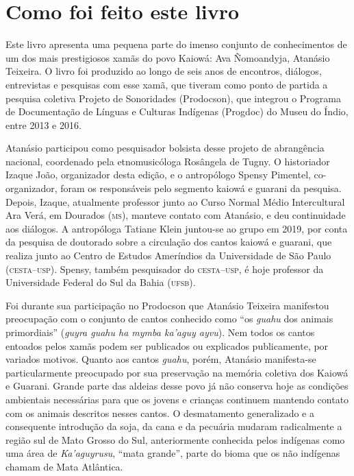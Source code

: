 \chapter{Como foi feito este livro}

Este livro apresenta uma pequena parte do imenso conjunto de
conhecimentos de um dos mais prestigiosos xamãs do povo Kaiowá: Ava
Ñomoandyja, Atanásio Teixeira. O livro foi produzido ao longo de seis
anos de encontros, diálogos, entrevistas e pesquisas com esse xamã, que
tiveram como ponto de partida a pesquisa coletiva Projeto de Sonoridades
(Prodocson), que integrou o Programa de Documentação de Línguas e
Culturas Indígenas (Progdoc) do Museu do Índio, entre 2013 e 2016.

Atanásio participou como pesquisador bolsista desse projeto de
abrangência nacional, coordenado pela etnomusicóloga Rosângela de Tugny.
O historiador Izaque João, organizador desta edição, e o antropólogo
Spensy Pimentel, co-organizador, foram os responsáveis pelo segmento
kaiowá e guarani da pesquisa. Depois, Izaque, atualmente
professor junto ao Curso Normal Médio Intercultural Ara Verá, em
Dourados (\textsc{ms}), manteve contato com Atanásio, e deu continuidade aos
diálogos. A antropóloga Tatiane Klein juntou-se ao grupo em 2019, por
conta da pesquisa de doutorado sobre a circulação dos cantos kaiowá e
guarani, que realiza junto ao Centro de Estudos Ameríndios da
Universidade de São Paulo (\textsc{cesta}--\textsc{usp}). Spensy, também pesquisador do
\textsc{cesta}--\textsc{usp}, é hoje professor da Universidade Federal do Sul da Bahia
(\textsc{ufsb}).

Foi durante sua participação no Prodocson que Atanásio Teixeira
manifestou preocupação com o conjunto de cantos conhecido como ``os
\textit{guahu} dos animais primordiais'' (\textit{guyra guahu ha
mymba ka'aguy ayvu}). Nem todos os cantos entoados pelos xamãs podem ser
publicados ou explicados publicamente, por variados motivos. Quanto aos
cantos \textit{guahu}, porém, Atanásio manifesta-se particularmente
preocupado por sua preservação na memória coletiva dos Kaiowá e Guarani.
Grande parte das aldeias desse povo já não conserva hoje as condições
ambientais necessárias para que os jovens e crianças continuem mantendo
contato com os animais descritos nesses cantos. O desmatamento
generalizado e a consequente introdução da soja, da cana e da pecuária
mudaram radicalmente a região sul de Mato Grosso do Sul, anteriormente
conhecida pelos indígenas como uma área de \textit{Ka'aguyrusu}, ``mata
grande'', parte do bioma que os não indígenas chamam de Mata Atlântica.

